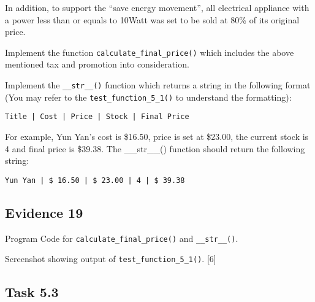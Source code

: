 In addition, to support the \textquotedblleft save energy movement\textquotedblright ,
all electrical appliance with a power less than or equals to 10Watt
was set to be sold at 80\% of its original price. 

Implement the function \texttt{calculate\_final\_price()} which includes
the above mentioned tax and promotion into consideration. 

Implement the \texttt{\_\_str\_\_()} function which returns a string
in the following format (You may refer to the \texttt{test\_function\_5\_1()}
to understand the formatting): 

\texttt{Title | Cost | Price | Stock | Final Price }

For example, Yun Yan\textquoteright s cost is \$16.50, price is set
at \$23.00, the current stock is 4 and final price is \$39.38. The
\_\_str\_\_() function should return the following string:

\texttt{Yun Yan | \$ 16.50 | \$ 23.00 | 4 | \$ 39.38}

\subsection*{Evidence 19 }

Program Code for \texttt{calculate\_final\_price()} and \texttt{\_\_str\_\_()}. 

Screenshot showing output of \texttt{test\_function\_5\_1()}. \hfill{}{[}6{]}

\subsection*{Task 5.3}

